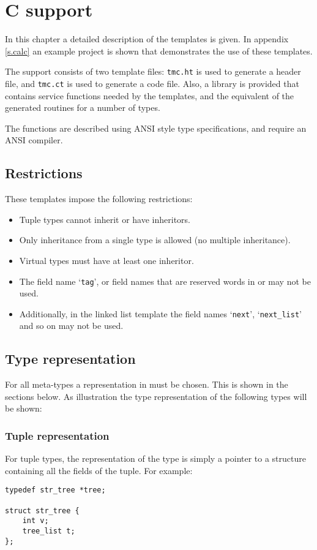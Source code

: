 \chapter{C support}
\label{s.tmc}
In this chapter a detailed description of the {\C} templates is given.
In appendix \ref{s.calc} an example project is shown that demonstrates
the use of these templates.
\par
The {\C} support consists of two template files: \texttt{tmc.ht} is used
to generate a header file, and \texttt{tmc.ct} is used to generate a code
file. Also, a library is provided that contains service functions
needed by the templates, and the equivalent of the generated routines
for a number of {\C} types.
\par
{}
The functions are described using ANSI {\C} style type specifications,
and require an ANSI {\C} compiler.
\section{Restrictions}
These templates impose the following restrictions:
\begin{itemize}
\setlength{\itemsep}{0pt}
\item Tuple types cannot inherit or have inheritors.
\item Only inheritance from a single type is allowed (no multiple inheritance).
\item Virtual types must have at least one inheritor.
\item The field name `\texttt{tag}', or field names that are
reserved words in {\C} or {\Cplusplus} may not be used.
\item Additionally, in the linked list template the field names
`\texttt{next}', `\texttt{next\_list}' and so on may not be used.
\end{itemize}
\section{Type representation}
For all {\Tm} meta-types a representation in {\C} must be chosen.
This is shown in the sections below.
As illustration the type representation of the following types
will be shown:

\subsection{Tuple representation}
For tuple types, the representation of the type is simply a pointer to
a structure containing all the fields of the tuple.
For example:
\begin{showfile}
\begin{verbatim}
typedef str_tree *tree;

struct str_tree {
    int v;
    tree_list t;
};
\end{verbatim}
\end{showfile}
